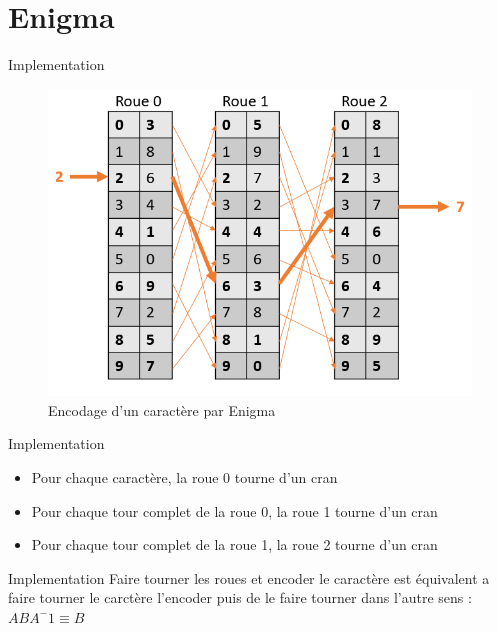 \documentclass[10pt]{beamer}
\begin{document}
\section[\Large{\texttt{\textit{Enigma}}}]{Enigma}


\begin{frame}{Implementation}
    \begin{figure}
        \includegraphics[scale=0.5]{Enigma.PNG}
        \caption{Encodage d'un caractère par Enigma}
  \end{figure}
  
\end{frame}
\begin{frame}{Implementation}
    \begin{itemize}
        \item Pour chaque caractère, la roue 0 tourne d'un cran
        \item Pour chaque tour complet de la roue 0, la roue 1 tourne d'un cran
        \item Pour chaque tour complet de la roue 1, la roue 2 tourne d'un cran
    \end{itemize}
  
\end{frame}
\begin{frame}{Implementation}
    Faire tourner les roues et encoder le caractère est équivalent a faire tourner le carctère l'encoder puis de le faire tourner dans l'autre sens : $ABA^-1 \equiv B$  
  
\end{frame}
\end{document}
